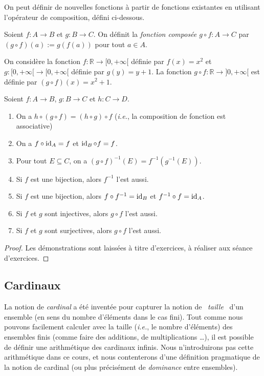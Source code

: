 \documentclass[french,course,oneside,theoremnosection]{lecture}
\newcommand{\R}{\mathbb{R}}
\begin{document}
On peut définir de nouvelles fonctions à partir de fonctions existantes en utilisant l'opérateur de composition, défini ci-dessous.
\begin{definition}
Soient $f\colon A \to B$ et $g\colon B \to C$. On définit la \emph{fonction composée $g\circ f\colon A \to C$} par $(g\circ f)(a):=g(f(a))$ pour tout $a\in A$. 
\end{definition}
\begin{example}
On considère la fonction $f\colon \R \to [0, +\infty[$ définie par $f(x)=x^2$ et $g\colon [0,+\infty[ \to [0,+\infty[$ définie par $g(y)=y+1$. La fonction $g\circ f\colon \R \to ]0, +\infty[$ est définie par $(g\circ f)(x)=x^2+1$. 
\end{example}

\begin{proposition}\label{prop:compo}
Soient $f\colon A \to B$,  $g\colon B \to C$ et $h\colon C \to D$.
\begin{enumerate}
\item\label{it:hge_asso} On a $h \circ (g \circ f)=(h\circ g) \circ f$ (\emph{i.e.}, la composition de fonction est associative)
\item\label{it:hge_id} On a $f\circ \operatorname{id}_A = f$ et $\operatorname{id}_B \circ f = f$.
\item Pour tout $E \subseteq C$, on a $(g\circ f)^{-1}(E)=f^{-1}(g^{-1}(E))$.
\item\label{it:hge_reci} Si $f$ est une bijection, alors $f^{-1}$ l'est aussi.
\item\label{it:hge_reci2} Si $f$ est une bijection, alors $f\circ f^{-1}=\operatorname{id}_B$ et $f^{-1} \circ f= \operatorname{id}_A$.
\item\label{it:hge_inj} Si $f$ et $g$ sont injectives, alors $g\circ f$ l'est aussi.
\item\label{it:hge_surj} Si $f$ et $g$ sont surjectives, alors $g\circ f$ l'est aussi.
\end{enumerate}
\end{proposition}
\begin{proof}
Les démonstrations sont laissées à titre d'exercices, à réaliser aux séance d'exercices.
\end{proof}
\subsection{Cardinaux}
La notion de \emph{cardinal} a été inventée pour capturer la notion de  \og~\emph{taille}~\fg{} d'un ensemble (en sens du nombre d'éléments dans le cas fini). Tout comme nous pouvons facilement calculer avec la taille (\emph{i.e.}, le nombre d'éléments) des ensembles finis (comme faire des additions, de multiplications \ldots), il est possible de définir une arithmétique des cardinaux infinis. Nous n'introduirons pas cette arithmétique dans ce cours, et nous contenterons d'une définition pragmatique de la notion de cardinal (ou plus précisément de \emph{dominance} entre ensembles).
\end{document}
